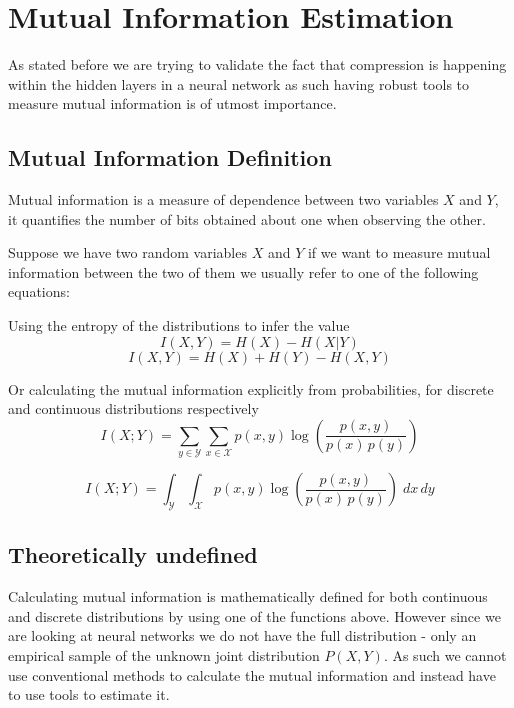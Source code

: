 
\section{Mutual Information Estimation}

As stated before we are trying to validate the fact that compression is
happening within the hidden layers in a neural network as such having robust
tools to measure mutual information is of utmost importance. 

\subsection{Mutual Information Definition}

Mutual information is a measure of dependence between two variables $ X $ and $
Y $, it quantifies the number of bits obtained about one when observing the
other.

Suppose we have two random variables $ X $ and $ Y $ if we want to measure
mutual information between the two of them we usually refer to one of the
following equations:

\medskip

Using the entropy of the distributions to infer the value
\begin{equation}
  I(X, Y) = H(X) - H(X|Y)
\end{equation}
\begin{equation}
  I(X, Y) = H(X) + H(Y) - H(X,Y)
\end{equation}

Or calculating the mutual information explicitly from probabilities, for
discrete and continuous distributions respectively
\begin{equation}
      {I} (X;Y)=\sum _{y\in {\mathcal {Y}}}\sum _{x\in {\mathcal
      {X}}}{p(x,y)\log {\left({\frac {p(x,y)}{p(x)\,p(y)}}\right)}} 
\end{equation}

\begin{equation}
    {I} (X;Y)=\int _{\mathcal {Y}}\int _{\mathcal {X}}{p(x,y)\log {\left({\frac
    {p(x,y)}{p(x)\,p(y)}}\right)}}\;dx\,dy
\end{equation}


\subsection{Theoretically undefined}

Calculating mutual information is mathematically defined for both continuous and
discrete distributions by using one of the functions above. However since we are
looking at neural networks we do not have the full distribution - only an
empirical sample of the unknown joint distribution $ P(X,Y) $. As such we cannot
use conventional methods to calculate the mutual information and instead have to
use tools to estimate it.

